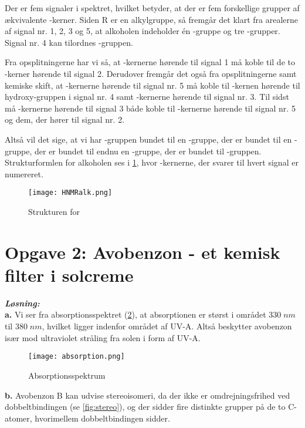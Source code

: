 \documentclass{report}
\newcommand{\sol}{\setlength{\parindent}{0cm}\textbf{\textit{Løsning:}}\setlength{\parindent}{1cm}}
\begin{document}
Der er fem signaler i spektret, hvilket betyder, at der er fem forskellige grupper af ækvivalente -kerner.
Siden R er en alkylgruppe, så fremgår det klart fra arealerne af signal nr. 1, 2, 3 og 5, at alkoholen indeholder én -gruppe og tre -grupper.
Signal nr. 4 kan tilordnes -gruppen.

Fra opsplitningerne har vi så, at -kernerne hørende til signal 1 må koble til de to -kerner hørende til signal 2.
Derudover fremgår det også fra opsplitningerne samt kemiske skift, at -kernerne hørende til signal nr. 5 må koble til -kernen hørende til hydroxy-gruppen i signal nr. 4 samt -kernerne hørende til signal nr. 3.
Til sidst må -kernerne hørende til signal 3 både koble til -kernerne hørende til signal nr. 5 og dem, der hører til signal nr. 2.

Altså vil det sige, at vi har -gruppen bundet til en -gruppe, der er bundet til en -gruppe, der er bundet til endnu en -gruppe, der er bundet til -gruppen. 
Strukturformlen for alkoholen ses i \cref{fig:HNMRalk}, hvor -kernerne, der svarer til hvert signal er numereret.
\begin{figure}[H]
\begin{center}
  \texttt{[image: HNMRalk.png]}
\end{center}
\caption{Strukturen for  }
\label{fig:HNMRalk}
\end{figure}

\section*{Opgave 2:    Avobenzon - et kemisk filter i solcreme}
\sol \\
\textbf{a.}
Vi ser fra absorptionsspektret (\cref{fig:absorption}), at absorptionen er størst i området $330 \;\unit{nm} $ til $380 \;\unit{nm} $, hvilket ligger indenfor området af UV-A. 
Altså beskytter avobenzon især mod ultraviolet stråling fra solen i form af UV-A.
\begin{figure}[H]
\begin{center}
  \texttt{[image: absorption.png]}
\end{center}
\caption{Absorptionsspektrum}
\label{fig:absorption}
\end{figure}
\noindent \textbf{b.}
Avobenzon B kan udvise stereoisomeri, da der ikke er omdrejningsfrihed ved dobbeltbindingen (se \cref{fig:stereo}), og der sidder fire distinkte grupper på de to C-atomer, hvorimellem dobbeltbindingen sidder.
\end{document}
